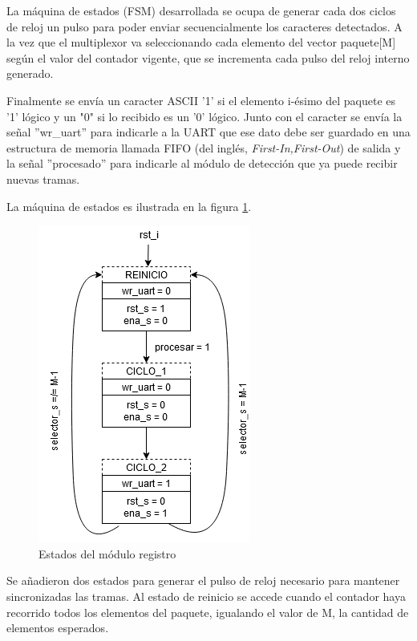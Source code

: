 		
		La máquina de estados (FSM) desarrollada se ocupa de generar cada dos ciclos de reloj un pulso para poder enviar secuencialmente los caracteres detectados. A la vez que el multiplexor va seleccionando cada elemento del vector paquete[M] según el valor del contador vigente, que se incrementa cada pulso del reloj interno generado.
		
		Finalmente se envía un caracter ASCII '1' si el elemento i-ésimo del paquete es '1' lógico y un "0" si lo recibido es un '0' lógico. Junto con el caracter se envía la señal ''wr\_uart'' para indicarle a la UART que ese dato debe ser guardado en una estructura de memoria llamada FIFO (del inglés, \textit{First-In,First-Out}) de salida y la señal ''procesado'' para indicarle al módulo de detección que ya puede recibir nuevas tramas.
	
		La máquina de estados es ilustrada en la figura \ref{fig:Estado_Registro}. 
		
		\begin{figure}[h]
		\centering
			\includegraphics[scale=.85]{./Figures/Estados-Registro}
			\caption{Estados del módulo registro}
			\label{fig:Estado_Registro}
		\end{figure}
		
		\vspace{10cm}	
		
		Se añadieron dos estados para generar el pulso de reloj necesario para mantener sincronizadas las tramas. Al estado de reinicio se accede cuando el contador haya recorrido todos los elementos del paquete, igualando el valor de M, la cantidad de elementos esperados. 
		
